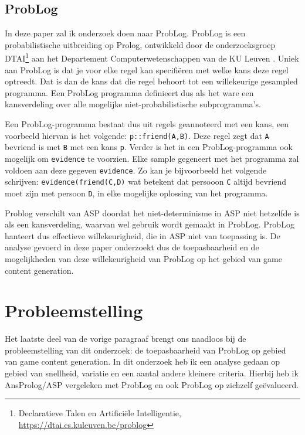 \documentclass{article}
\begin{document}
	\subsection{ProbLog}
	In deze paper zal ik onderzoek doen naar ProbLog. ProbLog is een probabilistische uitbreiding op Prolog, ontwikkeld door de onderzoeksgroep DTAI\footnote{Declaratieve Talen en Artifici\"ele Intelligentie, \url{https://dtai.cs.kuleuven.be/problog}} aan het Departement Computerwetenschappen van de KU Leuven \cite{raedt07problog}. Uniek aan ProbLog is dat je voor elke regel kan specifi\"eren met welke kans deze regel optreedt. Dat is dan de kans dat die regel behoort tot een willekeurige gesampled programma. Een ProbLog programma definieert dus als het ware een kansverdeling over alle mogelijke niet-probabilistische subprogramma's. 
	
Een ProbLog-programma bestaat dus uit regels geannoteerd met een kans, een voorbeeld hiervan is het volgende: \texttt{p::friend(A,B)}. Deze regel zegt dat \texttt{A} bevriend is met \texttt{B} met een kans \texttt{p}. Verder is het in een ProbLog-programma ook mogelijk om \texttt{evidence} te voorzien. Elke sample gegeneert met het programma zal voldoen aan deze gegeven \texttt{evidence}. Zo kan je bijvoorbeeld het volgende schrijven: \texttt{evidence(friend(C,D)} wat betekent dat persooon \texttt{C} altijd bevriend moet zijn met persoon \texttt{D}, in elke mogelijke oplossing van het programma.

Problog verschilt van ASP doordat het niet-determinisme in ASP niet hetzelfde is als een kansverdeling, waarvan wel gebruik wordt gemaakt in ProbLog. ProbLog hanteert dus effectieve willekeurigheid, die in ASP niet van toepassing is. De analyse gevoerd in deze paper onderzoekt dus de toepasbaarheid en de mogelijkheden van deze willekeurigheid van ProbLog op het gebied van game content generation.

\section{Probleemstelling}
Het laatste deel van de vorige paragraaf brengt ons naadloos bij de probleemstelling van dit onderzoek: de toepasbaarheid van ProbLog op gebied van game content generation. In dit onderzoek heb ik een analyse gedaan op gebied van snellheid, variatie en een aantal andere kleinere criteria. Hierbij heb ik AnsProlog/ASP vergeleken met ProbLog en ook ProbLog op zichzelf ge\"evalueerd.
\end{document}
